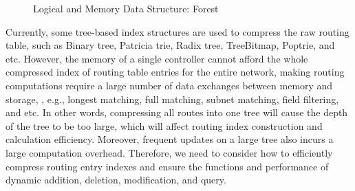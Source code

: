\begin{figure}
\centering
{}
\label{fig:forest-logical}
{}\label{fig:forest-mem}
\caption{\small Logical and Memory Data Structure: Forest}
\label{fig:foreststructure}
\end{figure}


Currently, some tree-based index structures are used to compress the raw routing table, such as Binary tree\cite{binarytree}, Patricia trie\cite{szpankowski1990patricia}, Radix tree\cite{sklower1991tree}, TreeBitmap\cite{eatherton2004tree}, Poptrie\cite{asai2015poptrie}, and etc. However, the memory of a single {\sys} controller cannot afford the whole compressed index of routing table entries for the entire network, making routing computations require a large number of data exchanges between memory and storage, , e.g., longest matching, full matching, subnet matching, field filtering, and etc. In other words, compressing all routes into one tree will cause the depth of the tree to be too large, which will affect routing index construction and calculation efficiency. Moreover, frequent updates on a large tree also incurs a large computation overhead. Therefore, we need to consider how to efficiently  compress routing entry indexes and ensure the  functions and performance of dynamic addition, deletion, modification, and query.

